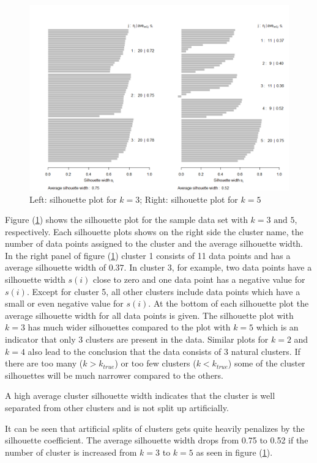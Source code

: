 \begin{figure}
	\centering
	\includegraphics[width=\textwidth]{figures/chapter_k_means/silhouette}
	\caption{Left: silhouette plot for $k=3$; Right: silhouette plot for $k=5$}
	\label{fig:silhouette}
\end{figure}

Figure (\ref{fig:silhouette}) shows the silhouette plot for the sample data set with $k=3 \text{ and } 5$, respectively. Each silhouette plots shows on the right side the cluster name, the number of data points assigned to the cluster and the average silhouette width. In the right panel of figure (\ref{fig:silhouette}) cluster 1 consists of 11 data points and has a average silhouette width of $0.37$. In cluster 3, for example, two data points have a silhouette width $s(i)$ close to zero and one data point has a negative value for $s(i)$. Except for cluster 5, all other clusters include data points which have a small or even negative value for $s(i)$. At the bottom of each silhouette plot the average silhouette width for all data points is given. The silhouette plot with $k=3$ has much wider silhouettes compared to the plot with $k=5$ which is an indicator that only 3 clusters are present in the data. Similar plots for $k=2$ and $k=4$ also lead to the conclusion that the data consists of 3 natural clusters. If there are too many ($k > k_{true}$) or too few clusters ($k < k_{true}$) some of the cluster silhouettes will be much narrower compared to the others.  

\begin{remark}
A high average cluster silhouette width indicates that the cluster is well separated from other clusters and is not split up artificially. 
\end{remark}
\begin{remark}
It can be seen that artificial splits of clusters gets quite heavily penalizes by the silhouette coefficient. The average silhouette width drops from 0.75 to 0.52 if the number of cluster is increased from $k=3$ to $k=5$ as seen in figure (\ref{fig:silhouette}).
\end{remark}

